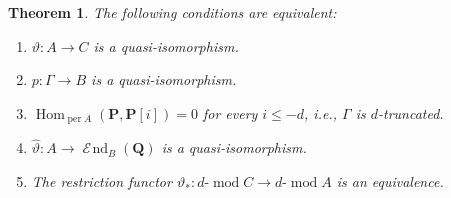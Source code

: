 \documentclass[11pt,a4paper,reqno]{amsart}
\theoremstyle{plain}
\newtheorem{theorem}{Theorem}[section]
\numberwithin{equation}{section}
\theoremstyle{definition}
\providecommand{\per}{\operatorname{per}}
\renewcommand{\mod}{\operatorname{mod}}
\newcommand{\Hom}{\operatorname{Hom}}
\DeclareMathOperator{\huaEnd}{\mathcal{E}\!nd}
\newcommand{\emod}[2]{#1\text{-}\!\mod #2}
\newcommand{\PP}{\mathbf{P}}
\newcommand{\QQ}{\mathbf{Q}}
\begin{document}
\begin{theorem}\label{thm:equiv}
The following conditions are equivalent:
\begin{enumerate}
\item $\vartheta\colon A\to C$ is a quasi-isomorphism.
\item $p\colon\Gamma\to B$ is a quasi-isomorphism.
\item $\Hom_{\per A}(\PP,\PP[i])=0$ for every $i\leq-d$, i.e., $\Gamma$ is $d$-truncated.
\item $\widehat\vartheta\colon A\to\huaEnd_B(\QQ)$ is a quasi-isomorphism.
\item The restriction functor $\vartheta_*\colon\emod{d}{C}\to\emod{d}{A}$ is an equivalence.
\end{enumerate}
\end{theorem}
\end{document}

